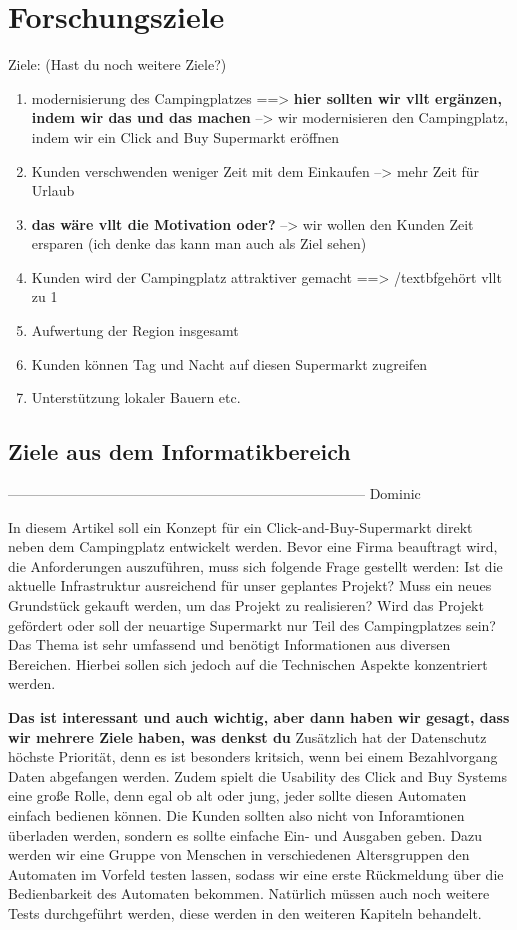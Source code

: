 \section{Forschungsziele}

Ziele: (Hast du noch weitere Ziele?)
\begin{enumerate}
    \item modernisierung des Campingplatzes ==> \textbf{hier sollten wir vllt ergänzen, indem wir das und das machen}
        --> wir modernisieren den Campingplatz, indem wir ein Click and Buy Supermarkt eröffnen
    \item Kunden verschwenden weniger Zeit mit dem Einkaufen --> mehr Zeit für Urlaub 
    \item \textbf{das wäre vllt die Motivation oder?} --> wir wollen den Kunden Zeit ersparen (ich denke das kann man auch als Ziel sehen)
    \item Kunden wird der Campingplatz attraktiver gemacht ==> /textbf{gehört vllt zu 1}
    \item Aufwertung der Region insgesamt
    \item Kunden können Tag und Nacht auf diesen Supermarkt zugreifen
    \item Unterstützung lokaler Bauern etc.
\end{enumerate}


\subsection{Ziele aus dem Informatikbereich}

----------------------------------------------------------------------------- Dominic

In diesem Artikel soll ein Konzept für ein Click-and-Buy-Supermarkt direkt neben dem Campingplatz entwickelt werden. 
Bevor eine Firma beauftragt wird, die Anforderungen auszuführen, muss sich folgende Frage gestellt werden: Ist die
aktuelle Infrastruktur ausreichend für unser geplantes Projekt? Muss ein neues Grundstück gekauft werden, um das 
Projekt zu realisieren? Wird das Projekt gefördert oder soll der neuartige Supermarkt nur Teil des Campingplatzes sein?
Das Thema ist sehr umfassend und benötigt Informationen aus diversen Bereichen. Hierbei sollen sich jedoch auf die 
Technischen Aspekte konzentriert werden.


\textbf{Das ist interessant und auch wichtig, aber dann haben wir gesagt, dass wir mehrere Ziele haben, was denkst du}
Zusätzlich hat der Datenschutz höchste Priorität, denn es ist besonders kritsich, wenn bei einem Bezahlvorgang 
Daten abgefangen werden. 
Zudem spielt die Usability des Click and Buy Systems eine große Rolle, denn egal ob alt oder jung, 
jeder sollte diesen Automaten einfach bedienen können. Die Kunden sollten also nicht von Inforamtionen überladen werden, 
sondern es sollte einfache Ein- und Ausgaben geben. Dazu werden wir eine Gruppe von Menschen in verschiedenen Altersgruppen 
den Automaten im Vorfeld testen lassen, sodass wir eine erste Rückmeldung über die Bedienbarkeit des Automaten bekommen.
Natürlich müssen auch noch weitere Tests durchgeführt werden, diese werden in den weiteren Kapiteln behandelt.


